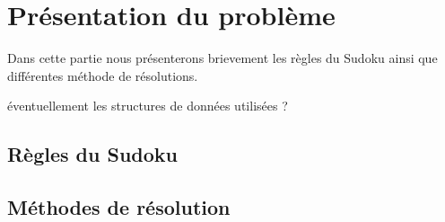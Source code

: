 

\chapter{Présentation du problème}
  
Dans cette partie nous présenterons brievement les règles du Sudoku ainsi que différentes méthode de résolutions.

\textcolor{BurntOrange}{éventuellement les structures de données utilisées ?}

    \section{Règles du Sudoku}



  \section{Méthodes de résolution}
